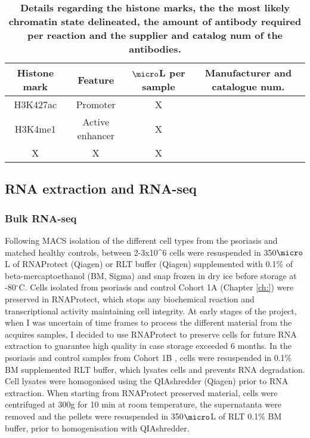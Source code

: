\begin{table}[htbp]
\setlength{\tabcolsep}{20pt}
\renewcommand{\arraystretch}{1.5}
\begin{tabular}{@{} c c c c}
\toprule
\textbf{Histone mark} & \textbf{Feature} &\textbf{$\micro$L per sample} & \textbf{Manufacturer and catalogue num.}\\
\midrule
H3K427ac & Promoter & X & \\
H3K4me1 & Active enhancer & X & \\
X & X & X & \\
\bottomrule
\end{tabular}
\medskip %
\caption[Antibody panel used for immunoprecipitation of histone marks in ChIPm]{\textbf{Details regarding the histone marks, the the most likely chromatin state delineated, the amount of antibody required per reaction and the supplier and catalog num of the antibodies.}}
\label{tab:ChIPm_antibodies}
\end{table}
\bigskip %


\subsection{RNA extraction and RNA-seq}

\subsubsection{Bulk RNA-seq}
Following MACS isolation of the different cell types from the psoriasis and matched healthy controls, between 2-3x10^6 cells were resuspended in 350$\micro$L of RNAProtect (Qiagen) or RLT buffer (Qiagen) supplemented with 0.1\% of beta-mercaptoethanol (BM, Sigma) and snap frozen in dry ice before storage at -80{$^\circ$}C. Cells isolated from psoriasis and control Cohort 1A (Chapter \ref{ch:}) were preserved in RNAProtect, which stops any biochemical reaction and transcriptional activity maintaining cell integrity. At early stages of the project, when I was uncertain of time frames to process the different material from the acquires samples, I decided to use RNAProtect to preserve cells for future RNA extraction to guarantee high quality in case storage exceeded 6 months. In the psoriasis and control samples from Cohort 1B %
, cells were resuspended in 0.1\% BM supplemented RLT buffer, which lysates cells and prevents RNA degradation. Cell lysates were homogonised using the QIAshredder (Qiagen) prior to RNA extraction. When starting from RNAProtect preserved material, cells were centrifuged at 300g for 10 min at room temperature, the supernatanta were removed and the pellets were resuspended in 350$\micro$L of RLT 0.1\% BM buffer, prior to homogenisation with QIAshredder.

